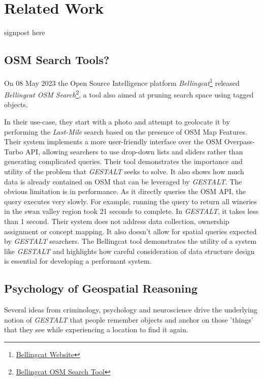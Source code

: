 \section{Related Work}
\label{section:related}

signpost here

\subsection{OSM Search Tools?}
On 08 May 2023 the Open Source Intelligence platform \textit{Bellingcat}\footnote{\href{https://www.bellingcat.com/about/who-we-are/}{Bellingcat Website}} released \textit{Bellingcat OSM Search}\footnote{\href{https://osm-search.bellingcat.com/}{Bellingcat OSM Search Tool}}\cite{Williams2023}, a tool also aimed at pruning search space using tagged objects.


In their use-case, they start with a photo and attempt to geolocate it by performing the \textit{Last-Mile} search based on the presence of OSM Map Features. Their system implements a more user-friendly interface over the OSM Overpass-Turbo API, allowing searchers to use drop-down lists and sliders rather than generating complicated queries. 
Their tool demonstrates the importance and utility of the problem that \textit{GESTALT} seeks to solve. It also shows how much data is already contained on OSM that can be leveraged by \textit{GESTALT}. The obvious limitation is in performance. As it directly queries the OSM API, the query executes very slowly. For example, running the query to return all wineries in the swan valley region took 21 seconds to complete. In \textit{GESTALT}, it takes less than 1 second. 
Their system does not address data collection, ownership assignment or concept mapping. It also doesn't allow for spatial queries expected by \textit{GESTALT} searchers. 
The Bellingcat tool demonstrates the utility of a system like \textit{GESTALT} and highlights how careful consideration of data structure design is essential for developing a performant system. 


\subsection{Psychology of Geospatial Reasoning}
Several ideas from criminology, psychology and neuroscience drive the underlying notion of \textit{GESTALT} that people remember objects and anchor on those 'things' that they see while experiencing a location to find it again. 

